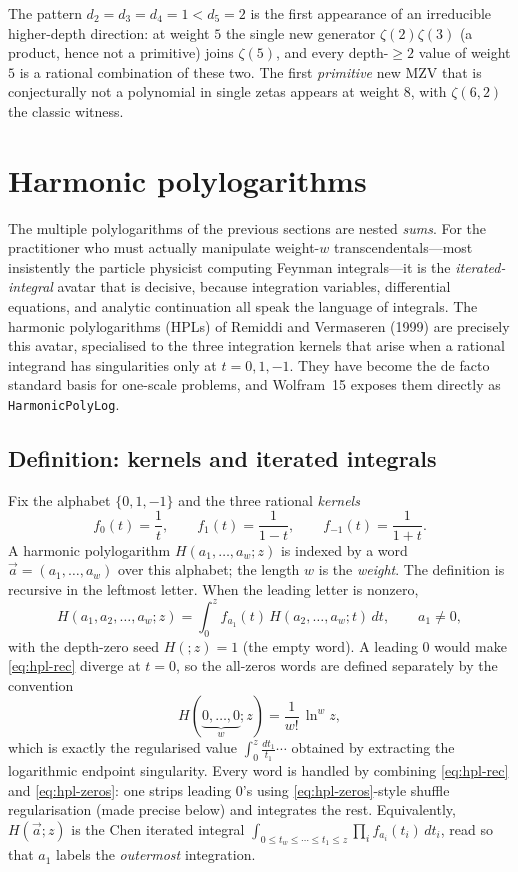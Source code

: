 \documentclass[11pt]{article}
\theoremstyle{plain}
\theoremstyle{remark}
\begin{document}
\noindent The pattern $d_2=d_3=d_4=1<d_5=2$ is the first appearance of an irreducible higher-depth direction: at weight $5$ the single new generator $\zeta(2)\zeta(3)$ (a product, hence not a primitive) joins $\zeta(5)$, and every depth-$\ge2$ value of weight $5$ is a rational combination of these two. The first \emph{primitive} new MZV that is conjecturally not a polynomial in single zetas appears at weight $8$, with $\zeta(6,2)$ the classic witness.


\section{Harmonic polylogarithms}

The multiple polylogarithms of the previous sections are nested \emph{sums}. For the practitioner who must actually manipulate weight-$w$ transcendentals---most insistently the particle physicist computing Feynman integrals---it is the \emph{iterated-integral} avatar that is decisive, because integration variables, differential equations, and analytic continuation all speak the language of integrals. The harmonic polylogarithms (HPLs) of Remiddi and Vermaseren (1999) are precisely this avatar, specialised to the three integration kernels that arise when a rational integrand has singularities only at $t=0,1,-1$. They have become the de facto standard basis for one-scale problems, and Wolfram~15 exposes them directly as \texttt{HarmonicPolyLog}.

\subsection{Definition: kernels and iterated integrals}

Fix the alphabet $\{0,1,-1\}$ and the three rational \emph{kernels}
\[
  f_{0}(t)=\frac1t,\qquad f_{1}(t)=\frac1{1-t},\qquad f_{-1}(t)=\frac1{1+t}.
\]
A harmonic polylogarithm $H(a_1,\dots,a_w;z)$ is indexed by a word $\vec a=(a_1,\dots,a_w)$ over this alphabet; the length $w$ is the \emph{weight}. The definition is recursive in the leftmost letter. When the leading letter is nonzero,
\begin{equation}\label{eq:hpl-rec}
  H(a_1,a_2,\dots,a_w;z)=\int_0^z f_{a_1}(t)\,H(a_2,\dots,a_w;t)\,dt,\qquad a_1\neq 0,
\end{equation}
with the depth-zero seed $H(;z)=1$ (the empty word). A leading $0$ would make \eqref{eq:hpl-rec} diverge at $t=0$, so the all-zeros words are defined separately by the convention
\begin{equation}\label{eq:hpl-zeros}
  H(\underbrace{0,\dots,0}_{w};z)=\frac{1}{w!}\,\ln^{w} z,
\end{equation}
which is exactly the regularised value $\int_0^z\frac{dt_1}{t_1}\cdots$ obtained by extracting the logarithmic endpoint singularity. Every word is handled by combining \eqref{eq:hpl-rec} and \eqref{eq:hpl-zeros}: one strips leading $0$'s using \eqref{eq:hpl-zeros}-style shuffle regularisation (made precise below) and integrates the rest. Equivalently, $H(\vec a;z)$ is the Chen iterated integral $\int_{0\le t_w\le\cdots\le t_1\le z}\prod_i f_{a_i}(t_i)\,dt_i$, read so that $a_1$ labels the \emph{outermost} integration.
\end{document}
